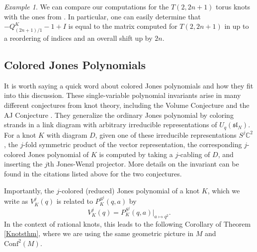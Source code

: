 \documentclass[11pt]{amsart}
\theoremstyle{plain}
\theoremstyle{definition}
\theoremstyle{remark}
\newtheorem*{example}{Example}
\begin{document}
\begin{example}
    We can compare our computations for the $T(2,2n+1)$ torus knots with the ones from \cite{K19}. In particular, one can easily determine that $-Q_{(2n+1)/1}^K-1+I$ is equal to the matrix computed for $T(2,2n+1)$ in \cite{K19} up to a reordering of indices and an overall shift up by $2n$.
\end{example}

\subsection{Colored Jones Polynomials}

It is worth saying a quick word about colored Jones polynomials and how they fit into this discussion. These single-variable polynomial invariants arise in many different conjectures from knot theory, including the Volume Conjecture \cite{M10,MM01,Mu25} and the AJ Conjecture \cite{LT11,L06}. They generalize the ordinary Jones polynomial by coloring strands in a link diagram with arbitrary irreducible representations of $U_q(\mathfrak{sl}_N)$. For a knot $K$ with diagram $D$, given one of these irreducible representations $S^j\mathbb{C}^2$, the $j$-fold symmetric product of the vector representation, the corresponding $j$-colored Jones polynomial of $K$ is computed by taking a $j$-cabling of $D$, and inserting the $j$th Jones-Wenzl projector. More details on the invariant can be found in the citations listed above for the two conjectures.

Importantly, the $j$-colored (reduced) Jones polynomial of a knot $K$, which we write as $V_K^j(q)$ is related to $P^{S^j}_K(q,a)$ by
\[
V_K^j(q)=P^{S^j}_K(q,a)\bigg|_{a\mapsto q^2}.
\]
In the context of rational knots, this leads to the following Corollary of Theorem \ref{Knotsthm}, where we are using the same geometric picture in $M$ and $\text{Conf}^2(M)$.
\end{document}
